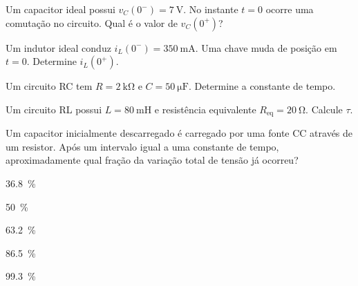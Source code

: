 \blocofixacao

\begin{questao}[1]{}
Um capacitor ideal possui $v_C(0^-)=\SI{7}{\volt}$. No instante $t=0$ ocorre uma
comutação no circuito. Qual é o valor de $v_C(0^+)$?
\end{questao}

\begin{questao}[1]{}
Um indutor ideal conduz $i_L(0^-)=\SI{350}{\milli\ampere}$. Uma chave muda de
posição em $t=0$. Determine $i_L(0^+)$.
\end{questao}

\begin{questao}[1]{}
Um circuito RC tem $R=\SI{2}{\kilo\ohm}$ e $C=\SI{50}{\micro\farad}$. Determine
a constante de tempo.
\end{questao}

\begin{questao}[1]{}
Um circuito RL possui $L=\SI{80}{\milli\henry}$ e resistência equivalente
$R_{\mathrm{eq}}=\SI{20}{\ohm}$. Calcule $\tau$.
\end{questao}

\begin{questao}[1]{}
Um capacitor inicialmente descarregado é carregado por uma fonte CC através de
um resistor. Após um intervalo igual a uma constante de tempo, aproximadamente
qual fração da variação total de tensão já ocorreu?
\begin{alternativas}[3]
\item \SI{36.8}{\percent}
\item \SI{50}{\percent}
\item \SI{63.2}{\percent}
\item \SI{86.5}{\percent}
\item \SI{99.3}{\percent}
\end{alternativas}
\end{questao}

